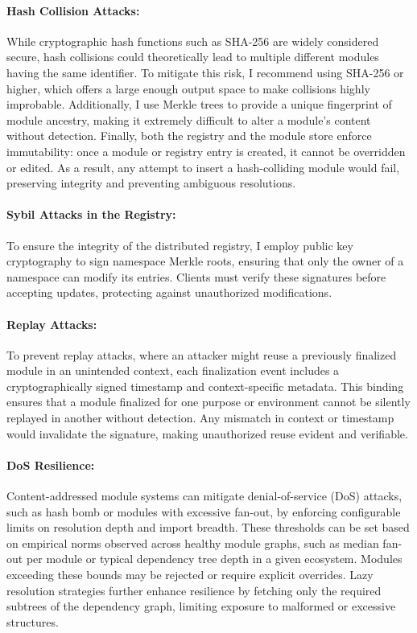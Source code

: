 \documentclass[sigplan,screen]{acmart}
\begin{document}
\paragraph{Hash Collision Attacks:} While cryptographic hash functions such as SHA-256 are widely considered secure, hash collisions could theoretically lead to multiple different modules having the same identifier. To mitigate this risk, I recommend using SHA-256 or higher, which offers a large enough output space to make collisions highly improbable. Additionally, I use Merkle trees to provide a unique fingerprint of module ancestry, making it extremely difficult to alter a module's content without detection. Finally, both the registry and the module store enforce immutability: once a module or registry entry is created, it cannot be overridden or edited. As a result, any attempt to insert a hash-colliding module would fail, preserving integrity and preventing ambiguous resolutions.


\paragraph{Sybil Attacks in the Registry:} To ensure the integrity of the distributed registry, I employ public key cryptography to sign namespace Merkle roots, ensuring that only the owner of a namespace can modify its entries. Clients must verify these signatures before accepting updates, protecting against unauthorized modifications.

\paragraph{Replay Attacks:} To prevent replay attacks, where an attacker might reuse a previously finalized module in an unintended context, each finalization event includes a cryptographically signed timestamp and context-specific metadata. This binding ensures that a module finalized for one purpose or environment cannot be silently replayed in another without detection. Any mismatch in context or timestamp would invalidate the signature, making unauthorized reuse evident and verifiable.

\paragraph{DoS Resilience:} Content-addressed module systems can mitigate denial-of-service (DoS) attacks, such as hash bomb or modules with excessive fan-out, by enforcing configurable limits on resolution depth and import breadth. These thresholds can be set based on empirical norms observed across healthy module graphs, such as median fan-out per module or typical dependency tree depth in a given ecosystem. Modules exceeding these bounds may be rejected or require explicit overrides. Lazy resolution strategies further enhance resilience by fetching only the required subtrees of the dependency graph, limiting exposure to malformed or excessive structures.
\end{document}
